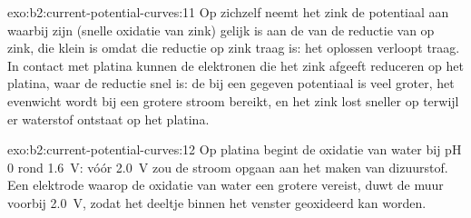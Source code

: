 \begin{solution}{exo:b2:current-potential-curves:11}
Op zichzelf neemt het zink de potentiaal aan waarbij zijn  (snelle
oxidatie van zink) gelijk is aan de  van de reductie van  op zink,
die klein is omdat die reductie op zink traag is: het oplossen verloopt
traag. In contact met platina kunnen de elektronen die het zink afgeeft 
reduceren op het platina, waar de reductie snel is: de  bij een gegeven
potentiaal is veel groter, het evenwicht wordt bij een grotere stroom bereikt, en het
zink lost sneller op terwijl er waterstof ontstaat op het platina.
\end{solution}

\begin{solution}{exo:b2:current-potential-curves:12}
Op platina begint de oxidatie van water bij pH 0 rond \qty{1.6}{V}: vóór
\qty{2.0}{V} zou de stroom opgaan aan het maken van dizuurstof. Een elektrode waarop
de oxidatie van water een grotere  vereist, duwt de muur voorbij
\qty{2.0}{V}, zodat het deeltje binnen het venster geoxideerd kan worden.
\end{solution}

